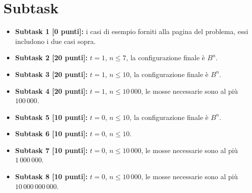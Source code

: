\vspace{0.5cm}

  
\section*{Subtask}

  \begin{itemize}
    \item \textbf{Subtask 1 [0 punti]:} i casi di esempio forniti alla pagina del problema, essi includono i due casi sopra.
    \item \textbf{Subtask 2 [20 punti]:} $t=1$, $n \le 7$, la configurazione finale è $B^n$.
    \item \textbf{Subtask 3 [20 punti]:} $t=1$, $n \le 10$, la configurazione finale è $B^n$.
    \item \textbf{Subtask 4 [20 punti]:} $t=1$, $n \le 10\,000$, le mosse necessarie sono al più $100\,000$.
    \item \textbf{Subtask 5 [10 punti]:} $t=0$, $n \le 10$, la configurazione finale è $B^n$.
    \item \textbf{Subtask 6 [10 punti]:} $t=0$, $n \le 10$.
    \item \textbf{Subtask 7 [10 punti]:} $t=0$, $n \le 10\,000$, le mosse necessarie sono al più $1\,000\,000$.
    \item \textbf{Subtask 8 [10 punti]:} $t=0$, $n \le 10\,000$, le mosse necessarie sono al più $10\,000\,000\,000$.
  \end{itemize}
  
